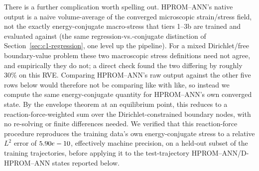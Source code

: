 \documentclass[10pt,a4paper]{article}
\begin{document}
There is a further complication worth spelling out. HPROM--ANN's native
output is a naive volume-average of the converged microscopic
strain/stress field, not the exactly energy-conjugate macro-stress that
tiers 1--3b are trained and evaluated against (the same
regression-vs.-conjugate distinction of Section~\ref{sec:c1-regression},
one level up the pipeline). For a mixed Dirichlet/free boundary-value
problem these two macroscopic stress definitions need not agree, and
empirically they do not; a direct check found the two differing by
roughly $30\%$ on this RVE. Comparing HPROM--ANN's raw output against the
other five rows below would therefore not be comparing like with like,
so instead we compute the same energy-conjugate quantity for
HPROM--ANN's own converged state. By the envelope theorem at an
equilibrium point, this reduces to a reaction-force-weighted sum over
the Dirichlet-constrained boundary nodes, with no re-solving or finite
differences needed. We verified that this reaction-force procedure
reproduces the training data's own energy-conjugate stress to a
relative $L^2$ error of $5.90e-10$, effectively
machine precision, on a held-out subset of the training trajectories,
before applying it to the test-trajectory HPROM--ANN/D-HPROM--ANN
states reported below.
\end{document}
